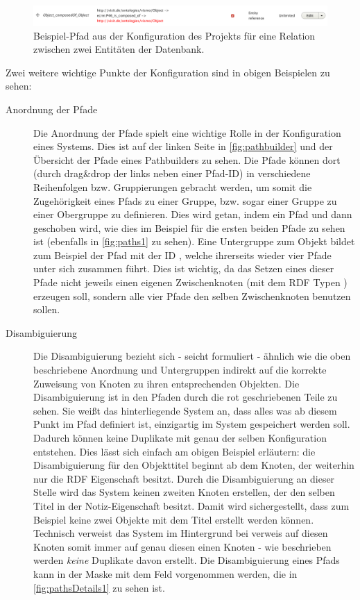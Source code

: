 \begin{figure}[htb]
    \centering
    \includegraphics[width=\textwidth]{Figures/berndl/paths2}
    \caption{\label{fig:paths2} Beispiel-Pfad aus der \wisski Konfiguration des \visit Projekts für eine Relation zwischen zwei Entitäten der Datenbank.}
\end{figure}

Zwei weitere wichtige Punkte der \wisski Konfiguration sind in obigen Beispielen zu sehen:

\begin{description}
	\item[Anordnung der Pfade] Die Anordnung der Pfade spielt eine wichtige Rolle in der Konfiguration eines \wisski Systems. Dies ist auf der linken Seite in \autoref{fig:pathbuilder} und der Übersicht der Pfade eines Pathbuilders zu sehen. Die Pfade können dort (durch drag\&drop der  links neben einer Pfad-ID) in verschiedene Reihenfolgen bzw. Gruppierungen gebracht werden, um somit die Zugehörigkeit eines Pfads zu einer Gruppe, bzw. sogar einer Gruppe zu einer Obergruppe zu definieren. Dies wird getan, indem ein Pfad  und dann  geschoben wird, wie dies im Beispiel für die ersten beiden Pfade zu sehen ist (ebenfalls in \autoref{fig:paths1} zu sehen). Eine Untergruppe zum Objekt bildet zum Beispiel der Pfad mit der ID \texttt{}, welche ihrerseits wieder vier Pfade unter sich zusammen führt. Dies ist wichtig, da das Setzen eines dieser Pfade nicht jeweils einen eigenen Zwischenknoten (mit dem RDF Typen \texttt{}) erzeugen soll, sondern alle vier Pfade den selben Zwischenknoten benutzen sollen.
	\item[Disambiguierung] Die Disambiguierung bezieht sich - seicht formuliert - ähnlich wie die oben beschriebene Anordnung und Untergruppen indirekt auf die korrekte Zuweisung von Knoten zu ihren entsprechenden Objekten. Die Disambiguierung ist in den Pfaden durch die rot geschriebenen Teile zu sehen. Sie weißt das hinterliegende System an, dass alles was ab diesem Punkt im Pfad definiert ist, einzigartig im System gespeichert werden soll. Dadurch können keine Duplikate mit genau der selben Konfiguration entstehen. Dies lässt sich einfach am obigen Beispiel erläutern: die Disambiguierung für den Objekttitel beginnt ab dem \texttt{} Knoten, der weiterhin nur die RDF Eigenschaft \texttt{} besitzt. Durch die Disambiguierung an dieser Stelle wird das System keinen zweiten Knoten erstellen, der den selben Titel in der Notiz-Eigenschaft besitzt. Damit wird sichergestellt, dass zum Beispiel keine zwei Objekte mit dem Titel  erstellt werden können. Technisch verweist das System im Hintergrund bei verweis auf diesen Knoten somit immer auf genau diesen einen Knoten - wie beschrieben werden \textit{keine} Duplikate davon erstellt. Die Disambiguierung eines Pfads kann in der Maske mit dem Feld \texttt{} vorgenommen werden, die in \autoref{fig:pathsDetails1} zu sehen ist.

\end{description}
